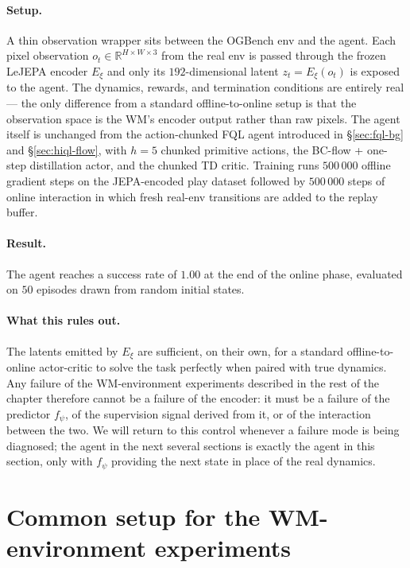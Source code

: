 \paragraph{Setup.} A thin observation wrapper sits between the OGBench env and the agent. Each pixel observation $o_t \in \mathbb{R}^{H\times W\times 3}$ from the real env is passed through the frozen LeJEPA encoder $E_\xi$ and only its $192$-dimensional latent $z_t = E_\xi(o_t)$ is exposed to the agent. The dynamics, rewards, and termination conditions are entirely real --- the only difference from a standard offline-to-online setup is that the observation space is the WM's encoder output rather than raw pixels. The agent itself is unchanged from the action-chunked FQL agent introduced in \S\ref{sec:fql-bg} and \S\ref{sec:hiql-flow}, with $h=5$ chunked primitive actions, the BC-flow + one-step distillation actor, and the chunked TD critic. Training runs $500\,000$ offline gradient steps on the JEPA-encoded play dataset followed by $500\,000$ steps of online interaction in which fresh real-env transitions are added to the replay buffer.

\paragraph{Result.} The agent reaches a success rate of $1.00$ at the end of the online phase, evaluated on $50$ episodes drawn from random initial states.

\paragraph{What this rules out.} The latents emitted by $E_\xi$ are sufficient, on their own, for a standard offline-to-online actor-critic to solve the task perfectly when paired with true dynamics. Any failure of the WM-environment experiments described in the rest of the chapter therefore cannot be a failure of the encoder: it must be a failure of the predictor $f_\psi$, of the supervision signal derived from it, or of the interaction between the two. We will return to this control whenever a failure mode is being diagnosed; the agent in the next several sections is exactly the agent in this section, only with $f_\psi$ providing the next state in place of the real dynamics.

\section{Common setup for the WM-environment experiments}
\label{sec:oo-setup}

